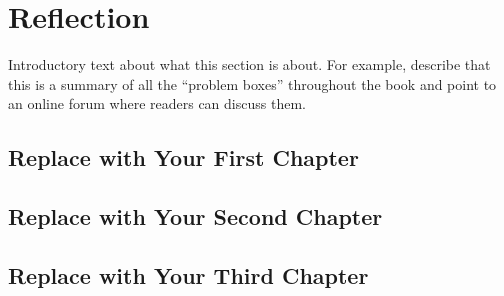 
\chapter{Reflection}

\begin{problem}
Introductory text about what this section is about. For example, describe that this is a summary of all the ``problem boxes'' throughout the book and point to an online forum where readers can discuss them.\end{problem}

\setlength{\parindent}{0.0cm}
\renewcommand{\index}[1]{}
\renewenvironment{problem}[1][]{$\bullet$\ #1}
\footnotesize 


\section*{Replace with Your First Chapter}


\section*{Replace with Your Second Chapter}

\section*{Replace with Your Third Chapter}
